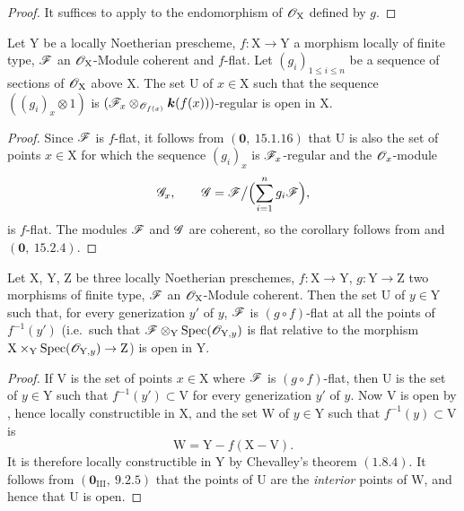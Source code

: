\begin{proof}
It suffices to apply  to the endomorphism of $\mathscr{O}_\mathrm{X}$ defined by $g$.
\end{proof}

\begin{corollary}[11.1.4]
\label{IV.11.1.4}
Let $\mathrm{Y}$ be a locally Noetherian prescheme, $f:\mathrm{X}\to\mathrm{Y}$ a morphism locally of finite type, $\mathscr{F}$ an $\mathscr{O}_\mathrm{X}$-Module coherent and $f$-flat. Let $(g_i)_{1\leqslant i\leqslant n}$ be a sequence of sections of $\mathscr{O}_\mathrm{X}$ above $\mathrm{X}$. The set $\mathrm{U}$ of $x\in\mathrm{X}$ such that the sequence $((g_i)_x\otimes 1)$ is $(\mathscr{F}_x\otimes_{\mathscr{O}_{f(x)}}\boldsymbol{k}(f(x)))$-regular is open in $\mathrm{X}$.
\end{corollary}

\begin{proof}
Since $\mathscr{F}$ is $f$-flat, it follows from
$(\mathbf{0},~15.1.16)$ that $\mathrm{U}$ is also the set of points
$x\in\mathrm{X}$ for which the sequence $(g_i)_x$ is
$\mathscr{F}_x$-regular and the $\mathscr{O}_x$-module
\[
  \mathscr{G}_x,\qquad
  \mathscr{G}=\mathscr{F}\big/\Bigl(\sum_{i=1}^n g_i\mathscr{F}\Bigr),
\]
is $f$-flat. The modules $\mathscr{F}$ and $\mathscr{G}$ are coherent, so the
corollary follows from  and
$(\mathbf{0},~15.2.4)$.
\end{proof}

\begin{corollary}[11.1.5]
\label{IV.11.1.5}
Let $\mathrm{X}$, $\mathrm{Y}$, $\mathrm{Z}$ be three locally Noetherian preschemes, $f:\mathrm{X}\to\mathrm{Y}$, $g:\mathrm{Y}\to\mathrm{Z}$ two morphisms of finite type, $\mathscr{F}$ an $\mathscr{O}_\mathrm{X}$-Module coherent. Then the set $\mathrm{U}$ of $y\in\mathrm{Y}$ such that, for every generization $y'$ of $y$, $\mathscr{F}$ is $(g\circ f)$-flat at all the points of $f^{-1}(y')$ \textup{(i.e.\ }such that $\mathscr{F}\otimes_\mathrm{Y}\operatorname{Spec}(\mathscr{O}_{\mathrm{Y},y})$ is flat relative to the morphism $\mathrm{X}\times_\mathrm{Y}\operatorname{Spec}(\mathscr{O}_{\mathrm{Y},y})\to\mathrm{Z}$\textup{)} is open in $\mathrm{Y}$.
\end{corollary}

\begin{proof}
If $\mathrm{V}$ is the set of points $x\in\mathrm{X}$ where $\mathscr{F}$ is
$(g\circ f)$-flat, then $\mathrm{U}$ is the set of $y\in\mathrm{Y}$ such
that $f^{-1}(y')\subset\mathrm{V}$ for every generization $y'$ of $y$.
Now $\mathrm{V}$ is open by , hence locally
constructible in $\mathrm{X}$, and the set $\mathrm{W}$ of
$y\in\mathrm{Y}$ such that $f^{-1}(y)\subset\mathrm{V}$ is
\[
  \mathrm{W}=\mathrm{Y}-f(\mathrm{X}-\mathrm{V}).
\]
It is therefore locally constructible in $\mathrm{Y}$ by Chevalley's
theorem $(1.8.4)$. It follows from
$(\mathbf{0}_{\mathrm{III}},~9.2.5)$ that the points of $\mathrm{U}$ are
the \emph{interior} points of $\mathrm{W}$, and hence that $\mathrm{U}$ is open.
\end{proof}


